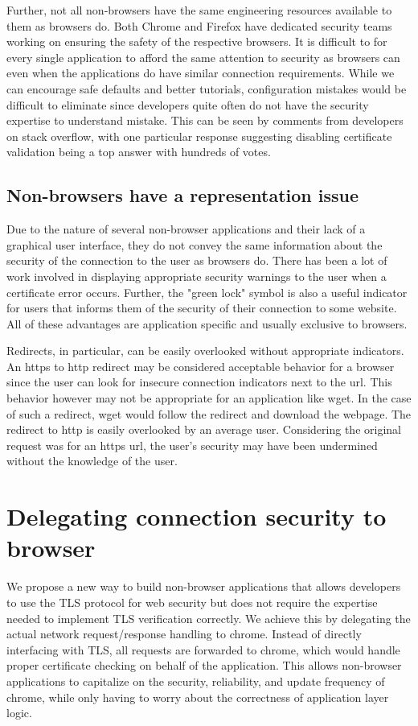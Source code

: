 Further, not all non-browsers have the same engineering resources available to
them as browsers do. Both Chrome and Firefox have dedicated security teams
working on ensuring the safety of the respective browsers. It is difficult to
for every single application to afford the same attention to security as
browsers can even when the applications do have similar connection
requirements. While we can encourage safe defaults and better tutorials,
configuration mistakes would be difficult to eliminate since developers quite
often do not have the security expertise to understand mistake. This can be
seen by comments from developers on stack overflow, with one particular
response suggesting disabling certificate validation being a top answer with
hundreds of votes.

\subsection{Non-browsers have a representation issue}
Due to the nature of several non-browser applications and their lack of a
graphical user interface, they do not convey the same information about the
security of the connection to the user as browsers do. There has been a lot of
work involved in displaying appropriate security warnings to the user when a
certificate error occurs. Further, the "green lock" symbol is also a useful
indicator for users that informs them of the security of their connection to
some website. All of these advantages are application specific and usually
exclusive to browsers.

Redirects, in particular, can be easily overlooked without appropriate
indicators. An https to http redirect may be considered acceptable behavior for
a browser since the user can look for insecure connection indicators next to
the url. This behavior however may not be appropriate for an application like
wget. In the case of such a redirect, wget would follow the redirect and download
the webpage. The redirect to http is easily overlooked by an average user.
Considering the original request was for an https url, the user's security
may have been undermined without the knowledge of the user.


\section{Delegating connection security to browser}
\label{sec:solution-saber}

We propose a new way to build non-browser applications that allows developers
to use the TLS protocol for web security but does not require the expertise
needed to implement TLS verification correctly. We achieve this by delegating
the actual network request/response handling to chrome. Instead of directly
interfacing with TLS, all requests are forwarded to chrome, which would handle
proper certificate checking on behalf of the application. This allows non-browser
applications to capitalize on the security, reliability, and update frequency of
chrome, while only having to worry about the correctness of application layer
logic.

